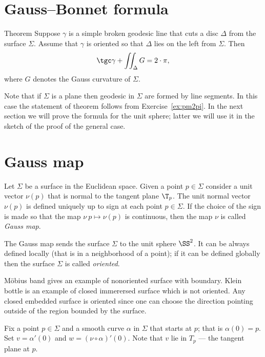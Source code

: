 \section{Gauss--Bonnet formula}

\begin{thm}{Theorem}
Suppose $\gamma$ is a simple broken geodesic line that cuts a disc $\Delta$ from the surface $\Sigma$.
Assume that $\gamma$ is oriented so that $\Delta$ lies on the left from $\Sigma$.
Then 
\[\tgc\gamma+\iint_\Delta G=2\cdot \pi,\]
where $G$ denotes the Gauss curvature of $\Sigma$.
\end{thm}

Note that if $\Sigma$ is a plane then geodesic in $\Sigma$ are formed by line segments.
In this case the statement of theorem follows from Exercise~\ref{ex:pm2pi}.
In the next section we will prove the formula for the unit sphere;
latter we will use it in the sketch of the proof of the general case.









\section{Gauss map}

Let $\Sigma$ be a surface in the Euclidean space.
Given a point $p\in\Sigma$ consider a unit vector $\nu(p)$ that is normal to the tangent plane $\T_p$. 
The unit normal vector $\nu(p)$ is defined uniquely up to sign at each point $p\in \Sigma$.
If the choice of the sign is made so that the map $\nu\:p\mapsto \nu(p)$ is continuous,
then the map $\nu$ is called \emph{Gauss map}.

The Gauss map sends the surface $\Sigma$ to the unit sphere $\SS^2$.
It can be always defined locally (that is in a neighborhood of a point);
if it can be defined globally then the surface $\Sigma$ is called \emph{oriented}.

M\"obius band gives an example of nonoriented surface with boundary.
Klein bottle is an example of closed immerersed surface which is not oriented.
Any closed embedded surface is oriented since one can choose the  direction pointing outside of the region bounded by the surface.

Fix a point $p\in \Sigma$ and a smooth curve $\alpha$ in $\Sigma$ that starts at $p$;
that is $\alpha(0)=p$.
Set  $v=\alpha'(0)$ and $w=(\nu\circ\alpha)'(0)$.
Note that $v$ lie in $T_p$ --- the tangent plane at $p$.

